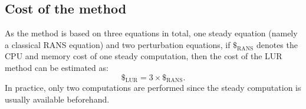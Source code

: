 \subsection{Cost of the method}
As the method is based on three equations in total, one steady equation 
(namely a classical RANS equation) and two perturbation equations, 
if $\mathdollar_{\text{RANS}}$ 
denotes the CPU and memory cost of
one steady computation, then the cost of the LUR
method can be estimated as:
\begin{equation}
	\mathdollar_{\text{LUR}} = 3 \times \mathdollar_{\text{RANS}}.
\end{equation}
In practice, only two computations are performed since the steady computation
is usually available beforehand.
